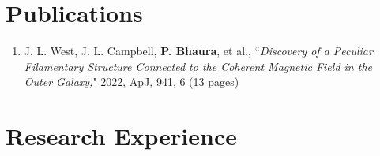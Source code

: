 \documentclass[10pt]{res} %
\begin{document}
\begin{resume}

\section{\Large Publications}
\vspace{-5pt} %
\noindent\makebox[\linewidth]{\rule{\textwidth}{0.4pt}}
\vspace{-10pt} %
\begin{enumerate}[{start=1,label=\arabic*.\addtocounter{enumi}{-2}}]
\itemsep-1em 
	\item J. L. West, J. L. Campbell, \textbf{P. Bhaura}, et al., ``\textit{Discovery of a Peculiar Filamentary Structure Connected to the Coherent Magnetic Field in the Outer Galaxy,}" \href{https://iopscience.iop.org/article/10.3847/1538-4357/ac9b58}{2022, ApJ, 941, 6} (13 pages)
\end{enumerate}



\section{\Large Research Experience}
\vspace{-5pt} %
\noindent\makebox[\linewidth]{\rule{\textwidth}{0.4pt}}
\vspace{-20pt} %


\end{resume}
\end{document}
